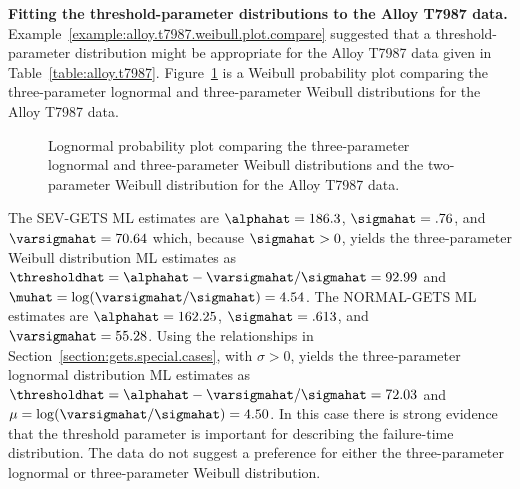 \begin{example}
\label{example:alloy.t7987.gets.mle}
{\bf Fitting the
threshold-parameter distributions to the Alloy T7987 data.}
Example~\ref{example:alloy.t7987.weibull.plot.compare} 
suggested that a threshold-parameter distribution might be appropriate
for the Alloy T7987 data given in
Table~\ref{table:alloy.t7987}.
Figure~\ref{figure:at7987.sevgets.gmleprobplot.ps}
is a Weibull probability plot comparing 
the three-parameter lognormal and three-parameter
Weibull distributions for the Alloy T7987 data.
\begin{figure}
\caption{Lognormal probability plot comparing 
the three-parameter lognormal and three-parameter
Weibull distributions and the two-parameter
Weibull distribution for the Alloy T7987 data.}
\label{figure:at7987.sevgets.gmleprobplot.ps}
\end{figure}
The SEV-GETS ML estimates are $\alphahat=186.3$, $\sigmahat =.76$, and
$\varsigmahat=70.64$ 
which, because $\sigmahat>0$, yields the three-parameter Weibull
distribution ML estimates as
$\thresholdhat=\alphahat-\varsigmahat/\sigmahat=92.99$
and $\muhat=\log(\varsigmahat/\sigmahat)=4.54$.
The NORMAL-GETS ML estimates are $\alphahat=162.25$, $\sigmahat=.613$, and
$\varsigmahat=55.28$. Using the relationships in
Section~\ref{section:gets.special.cases}, with $\sigma>0$, yields the
three-parameter lognormal distribution ML estimates as
$\thresholdhat=\alphahat-\varsigmahat/\sigmahat=72.03$ and
$\mu=\log(\varsigmahat/\sigmahat)=4.50$.
In this case there is strong evidence that the threshold parameter is
important for describing the failure-time distribution.  The data do
not suggest a preference for either the three-parameter lognormal or
three-parameter Weibull distribution.
\end{example}



